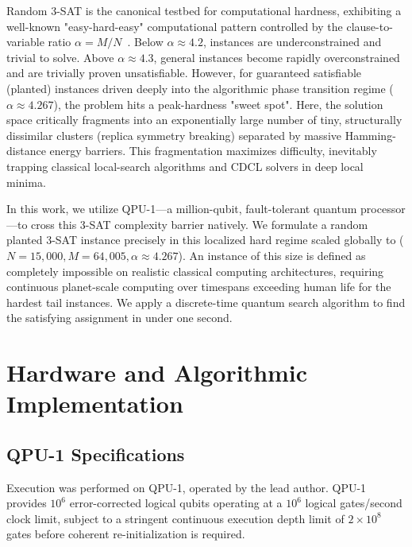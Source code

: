 \documentclass[twocolumn,superscriptaddress,prl]{revtex4-2}
\begin{document}
Random 3-SAT is the canonical testbed for computational hardness, exhibiting a well-known "easy-hard-easy" computational pattern controlled by the clause-to-variable ratio $\alpha = M/N$~\cite{Kirkpatrick1994, Mezard2002}. Below $\alpha \approx 4.2$, instances are underconstrained and trivial to solve. Above $\alpha \approx 4.3$, general instances become rapidly overconstrained and are trivially proven unsatisfiable. However, for guaranteed satisfiable (planted) instances driven deeply into the algorithmic phase transition regime ($\alpha \approx 4.267$), the problem hits a peak-hardness "sweet spot". Here, the solution space critically fragments into an exponentially large number of tiny, structurally dissimilar clusters (replica symmetry breaking) separated by massive Hamming-distance energy barriers. This fragmentation maximizes difficulty, inevitably trapping classical local-search algorithms and CDCL solvers in deep local minima.

In this work, we utilize QPU-1---a million-qubit, fault-tolerant quantum processor---to cross this 3-SAT complexity barrier natively. We formulate a random planted 3-SAT instance precisely in this localized hard regime scaled globally to ($N=15{,}000, M=64{,}005, \alpha \approx 4.267$). An instance of this size is defined as completely impossible on realistic classical computing architectures, requiring continuous planet-scale computing over timespans exceeding human life for the hardest tail instances. We apply a discrete-time quantum search algorithm to find the satisfying assignment in under one second.

\section{Hardware and Algorithmic Implementation}

\subsection{QPU-1 Specifications}

Execution was performed on QPU-1, operated by the lead author. QPU-1 provides $10^6$ error-corrected logical qubits operating at a $10^6$ logical gates/second clock limit, subject to a stringent continuous execution depth limit of $2 \times 10^8$ gates before coherent re-initialization is required. 
\end{document}
